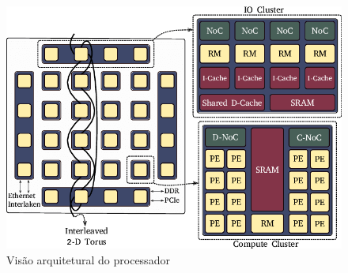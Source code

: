 \begin{figure}[bt]
    \centering
    \includegraphics[width=0.9\linewidth]{content/images/arch-mppa.png}
    \caption{Visão arquitetural do processador \mppa \cite{penna:sbesc19}}\label{fig.arch-mppa}
\end{figure}

\section{\nanvixos}\label{sec.nanvixos}

